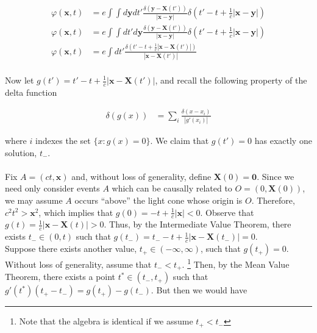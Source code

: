 \documentclass{article}
\begin{document}
\begin{equation}
\begin{split}
\varphi( \bm{x}, t) & = e\int \int  d\bm{y}dt' \frac{ \delta \left( \bm{y} - \bm{X} \left(  t'    \right) \right) }{|\bm{x} - \bm{y}|}    \delta \left(  t'  - t +  \frac{1}{c}| \bm{x} - \bm{y} | \right) \\
\varphi( \bm{x}, t) & = e\int \int dt' d\bm{y} \frac{ \delta \left( \bm{y} - \bm{X} \left(  t'    \right) \right) }{|\bm{x} - \bm{y}|}    \delta \left(  t'  - t +  \frac{1}{c}| \bm{x} - \bm{y} | \right) \\
\varphi( \bm{x}, t) & = e  \int  dt' \frac{   \delta \left(  t'  - t +  \frac{1}{c}| \bm{x} -  \bm{X} \left(  t'    \right) | \right)    }{|\bm{x} -  \bm{X} \left(  t'    \right)|}    \\
\end{split}
\end{equation}

Now let $g(t') = t'  - t +  \frac{1}{c}| \bm{x} -  \bm{X} \left(  t'    \right) | $, and recall the following property of the delta function

\begin{equation}
\begin{split}
\delta(g(x)) & = \sum_i \frac{ \delta(x-x_i)  }{ |g'(x_i) |  }
\end{split}
\end{equation}

where $i$ indexes the set $\{ x : g(x)=0 \}$. We claim that $g(t')=0$ has exactly one solution, $t_-$. \\
\hfill \\
Fix $A = (ct ,\bm{x})$ and, without loss of generality, define $\bm{X}(0)=\bm{0}$. Since we need only consider events $A$ which can be causally related to $O = (0, \bm{X}(0) )$, we may assume $A$ occurs ``above'' the light cone whose origin is $O$. Therefore, $c^2t^2 > \bm{x}^2$, which implies that $g(0) = -t + \frac{1}{c}|\bm{x}| < 0 $. Observe that $g(t) =  \frac{1}{c}| \bm{x} -  \bm{X} (t ) | > 0 $. Thus, by the Intermediate Value Theorem, there exists $t_- \in \left( 0, t \right)$ such that $g(t_-) = t_-  - t +  \frac{1}{c}| \bm{x} -  \bm{X} (  t_-) | = 0$. \\ 

Suppose there exists another value, $t_+ \in \left( -\infty, \infty \right)$, such that $g(t_+)= 0$. Without loss of generality, assume that $t_- < t_+$. \footnote{Note that the algebra is identical if we assume $t_+ < t_-$} Then, by the Mean Value Theorem, there exists a point $t^* \in \left( t_-, t_+ \right)$ such that $g'(t^*) ( t_+ - t_- )  = g( t_+ ) - g( t_-)$. But then we would have
\end{document}
